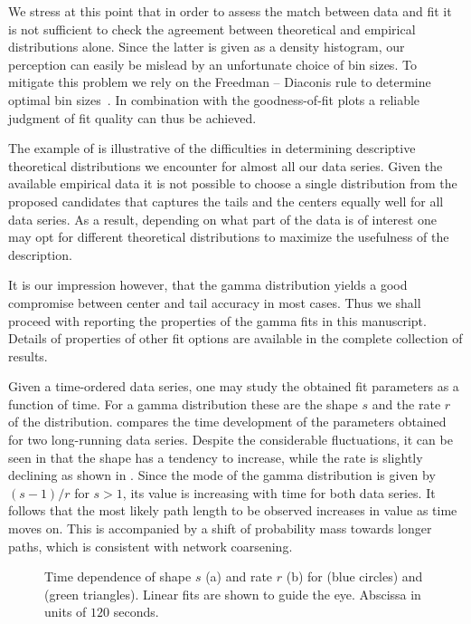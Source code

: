 		We stress at this point that in order to assess the match between data and fit it is not sufficient to check the agreement between theoretical and empirical distributions alone. Since the latter is given as a density histogram, our perception can easily be mislead by an unfortunate choice of bin sizes. To mitigate this problem we rely on the Freedman – Diaconis rule to determine optimal bin sizes~\cite{freedman1981histogram}. In combination with the goodness-of-fit plots a reliable judgment of fit quality can thus be achieved. 

		The example of  is illustrative of the difficulties in determining descriptive theoretical distributions we encounter for almost all our data series. Given the available empirical data it is not possible to choose a single distribution from the proposed candidates that captures the tails and the centers equally well for all data series. As a result, depending on what part of the data is of interest one may opt for different theoretical distributions to maximize the usefulness of the description.

		It is our impression however, that the gamma distribution yields a good compromise between center and tail accuracy in most cases. Thus we shall proceed with reporting the properties of the gamma fits in this manuscript. Details of properties of other fit options are available in the complete collection of results. 

		Given a time-ordered data series, one may study the obtained fit parameters as a function of time. For a gamma distribution these are the shape $s$ and the rate $r$ of the distribution.  compares the time development of the parameters obtained for two long-running data series. Despite the considerable fluctuations, it can be seen in  that the shape has a tendency to increase, while the rate is slightly declining as shown in . Since the mode of the gamma distribution is given by $(s-1)/r$ for $s > 1$, its value is increasing with time for both data series. It follows that the most likely path length to be observed increases in value as time moves on. This is accompanied by a shift of probability mass towards longer paths, which is consistent with network coarsening. 

		\begin{figure}
			\centering
			\qquad

			\caption[Path length distribution fit parameters.]{Time dependence of shape $s$ (a) and rate $r$ (b) for  (blue circles) and  (green triangles). Linear fits are shown to guide the eye. Abscissa in units of $120$ seconds.}
			\label{fig:path_lengths_fit_parameters}
		\end{figure}

